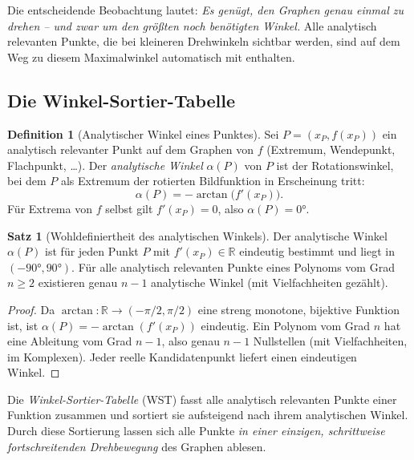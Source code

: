 ﻿\documentclass[12pt, a4paper]{article}
\theoremstyle{definition}
\newtheorem{definition}{Definition}[section]
\newtheorem{satz}{Satz}[section]
\begin{document}
	Die entscheidende Beobachtung lautet: \emph{Es genügt, den Graphen genau
		einmal zu drehen -- und zwar um den größten noch benötigten Winkel.}
	Alle analytisch relevanten Punkte, die bei kleineren Drehwinkeln sichtbar
	werden, sind auf dem Weg zu diesem Maximalwinkel automatisch mit enthalten.
	
	\subsection{Die Winkel-Sortier-Tabelle}
	
	\begin{definition}[Analytischer Winkel eines Punktes]
		Sei $P = (x_P, f(x_P))$ ein analytisch relevanter Punkt auf dem Graphen von $f$
		(Extremum, Wendepunkt, Flachpunkt, \ldots). Der \emph{analytische Winkel}
		$\alpha(P)$ von $P$ ist der Rotationswinkel, bei dem $P$ als Extremum der
		rotierten Bildfunktion in Erscheinung tritt:
		\[
		\alpha(P) = -\arctan\!\bigl(f'(x_P)\bigr).
		\]
		Für Extrema von $f$ selbst gilt $f'(x_P) = 0$, also $\alpha(P) = 0 °$.
	\end{definition}
	
	\begin{satz}[Wohldefiniertheit des analytischen Winkels]
		\label{satz:winkelwohldefiniert}
		Der analytische Winkel $\alpha(P)$ ist für jeden Punkt $P$ mit
		$f'(x_P) \in \mathbb{R}$ eindeutig bestimmt und liegt in $(-90 °, 90 °)$.
		Für alle analytisch relevanten Punkte eines Polynoms vom Grad $n \geq 2$
		existieren genau $n-1$ analytische Winkel (mit Vielfachheiten gezählt).
	\end{satz}
	
	\begin{proof}
		Da $\arctan: \mathbb{R} \to (-\pi/2, \pi/2)$ eine streng monotone, bijektive
		Funktion ist, ist $\alpha(P) = -\arctan(f'(x_P))$ eindeutig. Ein Polynom
		vom Grad $n$ hat eine Ableitung vom Grad $n-1$, also genau $n-1$ Nullstellen
		(mit Vielfachheiten, im Komplexen). Jeder reelle Kandidatenpunkt liefert
		einen eindeutigen Winkel.
	\end{proof}
	
	Die \emph{Winkel-Sortier-Tabelle} (WST) fasst alle analytisch relevanten
	Punkte einer Funktion zusammen und sortiert sie aufsteigend nach ihrem
	analytischen Winkel. Durch diese Sortierung lassen sich alle Punkte
	\emph{in einer einzigen, schrittweise fortschreitenden Drehbewegung}
	des Graphen ablesen.
	
\end{document}
